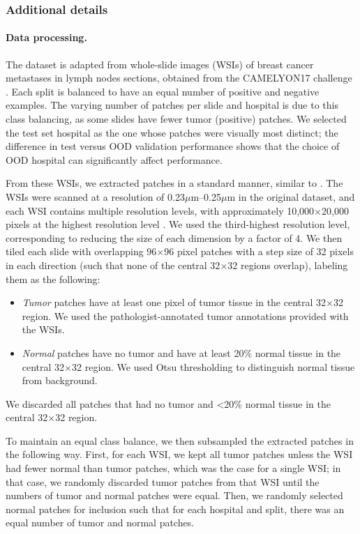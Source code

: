 \subsubsection{Additional details}\label{sec:app_camelyon_details}
\paragraph{Data processing.}
The \Camelyon dataset is adapted from whole-slide images (WSIs) of breast cancer metastases in lymph nodes sections, obtained from the CAMELYON17 challenge \citep{bandi2018detection}.
Each split is balanced to have an equal number of positive and negative examples.
The varying number of patches per slide and hospital is due to this class balancing, as some slides have fewer tumor (positive) patches.
We selected the test set hospital as the one whose patches were visually most distinct; the difference in test versus OOD validation performance shows that the choice of OOD hospital can significantly affect performance.

From these WSIs, we extracted patches in a standard manner, similar to \citet{veeling2018rotation}.
The WSIs were scanned at a resolution of 0.23$\mu$m--0.25$\mu$m in the original dataset, and each WSI contains multiple resolution levels, with approximately 10,000$\times$20,000 pixels at the highest resolution level
\citep{bandi2018detection}.
We used the third-highest resolution level, corresponding to reducing the size of each dimension by a factor of 4.
We then tiled each slide with overlapping 96$\times$96 pixel patches with a step size of 32 pixels in each direction (such that none of the central 32$\times$32 regions overlap), labeling them as the following:
\begin{itemize}
  \item \emph{Tumor} patches have at least one pixel of tumor tissue in the central 32$\times$32 region. We used the pathologist-annotated tumor annotations provided with the WSIs.
  \item \emph{Normal} patches have no tumor and have at least 20\% normal tissue in the central 32$\times$32 region. We used Otsu thresholding to distinguish normal tissue from background.
\end{itemize}
We discarded all patches that had no tumor and \textless20\% normal tissue in the central 32$\times$32 region.

To maintain an equal class balance, we then subsampled the extracted patches in the following way.
First, for each WSI, we kept all tumor patches unless the WSI had fewer normal than tumor patches, which was the case for a single WSI; in that case, we randomly discarded tumor patches from that WSI until the numbers of tumor and normal patches were equal.
Then, we randomly selected normal patches for inclusion such that for each hospital and split, there was an equal number of tumor and normal patches.

